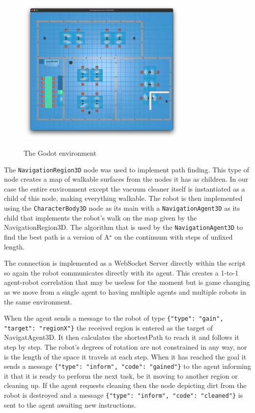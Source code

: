 \begin{figure}
    \centering
    \includegraphics[width=0.75\textwidth]{sections/imgs/env.png}
    \label{fig:godot}
    \caption{The Godot environment}
\end{figure}

The \texttt{NavigationRegion3D} node was used to implement path finding. This type of node creates a map of walkable surfaces from the nodes it has as children.
In our case the entire environment except the vacuum cleaner itself is instantiated as a child of this node, making everything walkable.
The robot is then implemented using the \texttt{CharacterBody3D} node as its main with a \texttt{NavigationAgent3D} as its child that implements the robot's walk on the map given by the NavigationRegion3D.
The algorithm that is used by the \texttt{NavigationAgent3D} to find the best path is a version of A$^\star$ on the continuum with steps of unfixed length.


The connection is implemented as a WebSocket Server directly within the script so again the robot communicates directly with its agent.
This creates a 1-to-1 agent-robot correlation that may be useless for the moment but is game changing as we move from a single agent to having multiple agents and multiple robots in the same environment.

When the agent sends a message to the robot of type \texttt{\{"type": "gain", "target": "regionX"\}} the received region is entered as the target of NavigatAgent3D.
It then calculates the shortestPath to reach it and follows it step by step. The robot's degrees of rotation are not constrained in any way, nor is the length of the space it travels at each step.
When it has reached the goal it sends a message \texttt{\{"type": "inform", "code": "gained"\}} to the agent informing it that it is ready to perform the next task, be it moving to another region or cleaning up.
If the agent requests cleaning then the node depicting dirt from the robot is destroyed and a message \texttt{\{"type": "inform", "code": "cleaned"\}} is sent to the agent awaiting new instructions.